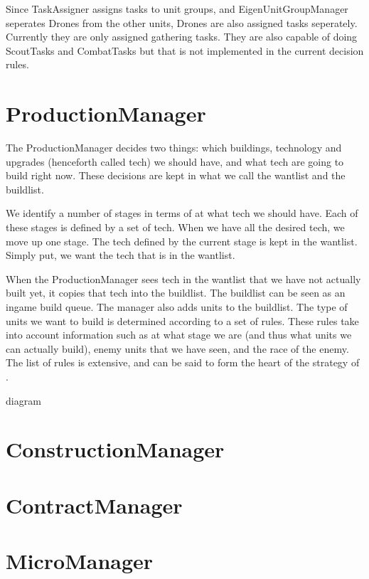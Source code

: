 Since TaskAssigner assigns tasks to unit groups, and EigenUnitGroupManager seperates Drones from the other units, Drones are also assigned tasks seperately. Currently they are only assigned gathering tasks. They are also capable of doing ScoutTasks and CombatTasks but that is not implemented in the current decision rules.

\section{ProductionManager}

The ProductionManager decides two things: which buildings, technology and upgrades (henceforth called tech) we should have, and what tech are going to build right now. These decisions are kept in what we call the wantlist and the buildlist.

We identify a number of stages in terms of at what tech we should have. Each of these stages is defined by a set of tech. When we have all the desired tech, we move up one stage. The tech defined by the current stage is kept in the wantlist. Simply put, we want the tech that is in the wantlist.

When the ProductionManager sees tech in the wantlist that we have not actually built yet, it copies that tech into the buildlist. The buildlist can be seen as an ingame build queue. The manager also adds units to the buildlist. The type of units we want to build is determined according to a set of rules. These rules take into account information such as at what stage we are (and thus what units we can actually build), enemy units that we have seen, and the race of the enemy. The list of rules is extensive, and can be said to form the heart of the strategy of \massexpand .

diagram

\section{ConstructionManager}

\section{ContractManager}

\section{MicroManager}